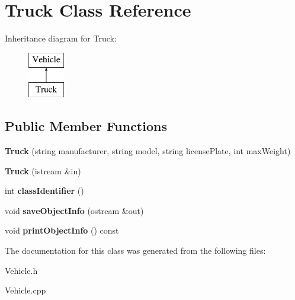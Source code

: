 \hypertarget{class_truck}{}\section{Truck Class Reference}
\label{class_truck}
Inheritance diagram for Truck\+:\begin{figure}[H]
\begin{center}
\leavevmode
\includegraphics[height=2.000000cm]{class_truck}
\end{center}
\end{figure}
\subsection*{Public Member Functions}
\begin{DoxyCompactItemize}
\item 
\hypertarget{class_truck_a0a8dd0074ba97cb9c9e4a85c1940f487}{}{\bfseries Truck} (string manufacturer, string model, string license\+Plate, int max\+Weight)\label{class_truck_a0a8dd0074ba97cb9c9e4a85c1940f487}

\item 
\hypertarget{class_truck_a5cfc074de127de059181b8b36c45ff63}{}{\bfseries Truck} (istream \&in)\label{class_truck_a5cfc074de127de059181b8b36c45ff63}

\item 
\hypertarget{class_truck_a520b836bc6d09157c03edbc8e28b0ae3}{}int {\bfseries class\+Identifier} ()\label{class_truck_a520b836bc6d09157c03edbc8e28b0ae3}

\item 
\hypertarget{class_truck_a05acb002a6530883dcfaf5b652108c7e}{}void {\bfseries save\+Object\+Info} (ostream \&out)\label{class_truck_a05acb002a6530883dcfaf5b652108c7e}

\item 
\hypertarget{class_truck_add59302c411d863d9fc8be4a91fe74b2}{}void {\bfseries print\+Object\+Info} () const \label{class_truck_add59302c411d863d9fc8be4a91fe74b2}

\end{DoxyCompactItemize}


The documentation for this class was generated from the following files\+:\begin{DoxyCompactItemize}
\item 
Vehicle.\+h\item 
Vehicle.\+cpp\end{DoxyCompactItemize}
